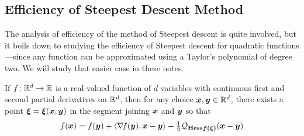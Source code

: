 \subsection{Efficiency of Steepest Descent Method}

The analysis of efficiency of the method of Steepest descent is quite involved, but it boils down to studying the efficiency of Steepest descent for quadratic functions---since any function can be approximated using a Taylor's polynomial of degree two.  We will study that easier case in these notes.

\begin{theorem}
If $f\colon \mathbb{R}^d \to \mathbb{R}$ is a real-valued function of $d$ variables with continuous first and second partial derivatives on $\mathbb{R}^d$, then for any choice $\boldsymbol{x}, \boldsymbol{y} \in \mathbb{R}^d$, there exists a point $\boldsymbol{\xi} = \boldsymbol{\xi}(\boldsymbol{x}, \boldsymbol{y})$ in the segment joining $\boldsymbol{x}$ and $\boldsymbol{y}$ so that
\begin{equation*}
f(\boldsymbol{x}) = f(\boldsymbol{y}) + \langle \mathop{\nabla\! {f}}(\boldsymbol{y}), \boldsymbol{x} - \boldsymbol{y} \rangle + \tfrac{1}{2} \mathcal{Q}_{\boldsymbol{\mathop{\mathrm{Hess}{f}}(\boldsymbol{\xi})}}(\boldsymbol{x} - \boldsymbol{y})
\end{equation*}
\end{theorem}

\separator

